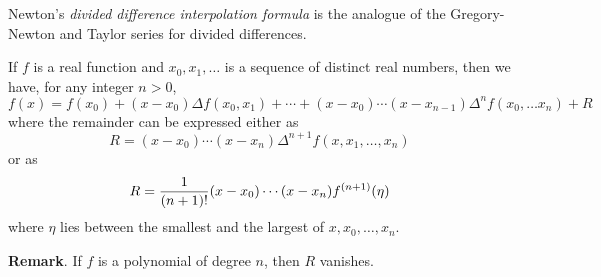 \documentclass[12pt]{article}
\begin{document}
Newton's \emph{divided difference interpolation formula} is the analogue 
of the Gregory-Newton and Taylor series for divided differences.

If $f$ is a real function and $x_0, x_1, \ldots$ is a sequence of distinct
real numbers, then we have, for any integer $n > 0$,
 \[ f (x) = f(x_0) + (x - x_0) \Delta f (x_0, x_1) + \cdots +
 (x - x_0) \cdots (x - x_{n-1}) \Delta^n f (x_0, \ldots x_n) + R\]
where the remainder can be expressed either as
 \[R = (x - x_0) \cdots (x - x_n) \Delta^{n+1} f (x, x_1, \ldots, x_n)\]
or as
 \[R = {1 \over (n+1)!} (x - x_0) \cdots (x - x_n) f^{(n+1)} (\eta)\]
where $\eta$ lies between the smallest and the largest of $x, x_0, 
\ldots, x_n$.

\textbf{Remark}.  If $f$ is a polynomial of degree $n$, then $R$ vanishes.
\end{document}
